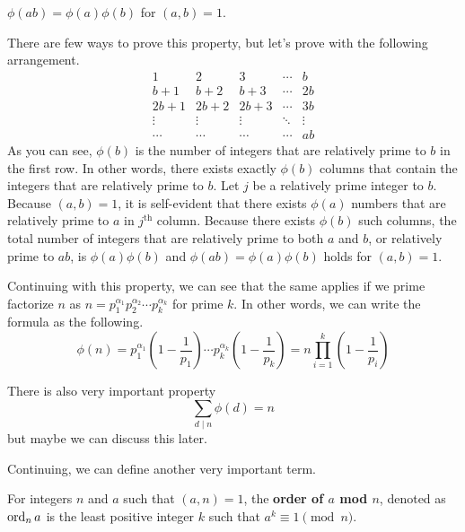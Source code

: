 \documentclass[../../../main.tex]{subfiles}
\begin{document}
\begin{important}
$\phi(ab) = \phi(a) \phi(b)$ for $(a, b) = 1$.
\end{important}

There are few ways to prove this property, but let's prove with
the following arrangement.
\[
\begin{array}{ccccc}
    1      & 2      & 3      & \cdots & b  \\
    b + 1  & b + 2  & b + 3  & \cdots & 2b \\
    2b + 1 & 2b + 2 & 2b + 3 & \cdots & 3b \\
    \vdots & \vdots & \vdots & \ddots & \vdots \\
    \cdots & \cdots & \cdots & \cdots & ab
\end{array}
\]
As you can see, $\phi(b)$ is the number of integers that are
relatively prime to $b$ in the first row. In other words,
there exists exactly $\phi(b)$ columns that contain the integers
that are relatively prime to $b$. Let $j$ be a relatively prime
integer to $b$. Because $(a, b) = 1$, it is self-evident that
there exists $\phi(a)$ numbers that are relatively prime to $a$
in $j^\text{th}$ column. Because there exists $\phi(b)$ such columns,
the total number of integers that are relatively prime to both
$a$ and $b$, or relatively prime to $ab$, is $\phi(a) \phi(b)$ and
$\phi(ab) = \phi(a) \phi(b)$ holds for $(a, b) = 1$.

\begin{important}
Continuing with this property, we can see that the same applies
if we prime factorize $n$ as $n = p_1^{\alpha_1} p_2^{\alpha_2}
\cdots p_k^{\alpha_k}$ for prime $k$. In other words, we can write
the formula as the following.
\[
\phi(n)
= p_1^{\alpha_1} \left( 1 - \frac{1}{p_1} \right)
    \cdots
    p_k^{\alpha_k} \left( 1 - \frac{1}{p_k} \right)
= n \prod_{i=1}^k \left( 1 - \frac{1}{p_i} \right)
\]
\end{important}

There is also very important property
\[
\sum_{d \mid n} \phi(d) = n
\]
but maybe we can discuss this later.

Continuing, we can define another very important term.

\begin{definition}{}{}
For integers $n$ and $a$ such that $(a, n) = 1$,
the \textbf{order of $a$ mod $n$}, denoted as $\operatorname{ord}_n a$ is
the least positive integer $k$ such that $a^k \equiv 1 \pmod{n}$.
\end{definition}
\end{document}

